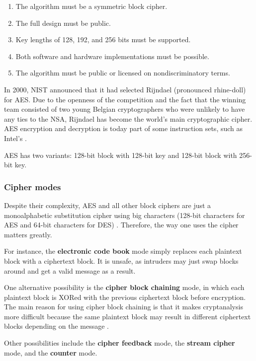 \begin{enumerate}
\item The algorithm must be a symmetric block cipher.
\item The full design must be public.
\item Key lengths of 128, 192, and 256 bits must be supported.
\item Both software and hardware implementations must be possible.
\item The algorithm must be public or licensed on nondiscriminatory terms.
\end{enumerate}

In 2000, NIST announced that it had selected Rijndael (pronounced rhine-doll) for AES.
Due to the openness of the competition and the fact that the winning team consisted of two young Belgian cryptographers who were unlikely to have any ties to the NSA, Rijndael has become the world's main cryptographic cipher.
AES encryption and decryption is today part of some instruction sets, such as Intel's \cite[p.~784]{computer-networks-tanenbaum-2012}.

AES has two variants: 128-bit block with 128-bit key and 128-bit block with 256-bit key.

\subsubsection{Cipher modes}

Despite their complexity, AES and all other block ciphers are just a monoalphabetic substitution cipher using big characters (128-bit characters for AES and 64-bit characters for DES) \cite[p.~787]{computer-networks-tanenbaum-2012}.
Therefore, the way one uses the cipher matters greatly.

For instance, the \textbf{electronic code book} mode simply replaces each plaintext block with a ciphertext block.
It is unsafe, as intruders may just swap blocks around and get a valid message as a result.

One alternative possibility is the \textbf{cipher block chaining} mode, in which each plaintext block is XORed with the previous ciphertext block before encryption.
The main reason for using cipher block chaining is that it makes cryptanalysis more difficult because the same plaintext block may result in different ciphertext blocks depending on the message \cite[p.~789]{computer-networks-tanenbaum-2012}.

Other possibilities include the \textbf{cipher feedback} mode, the \textbf{stream cipher} mode, and the \textbf{counter} mode.

